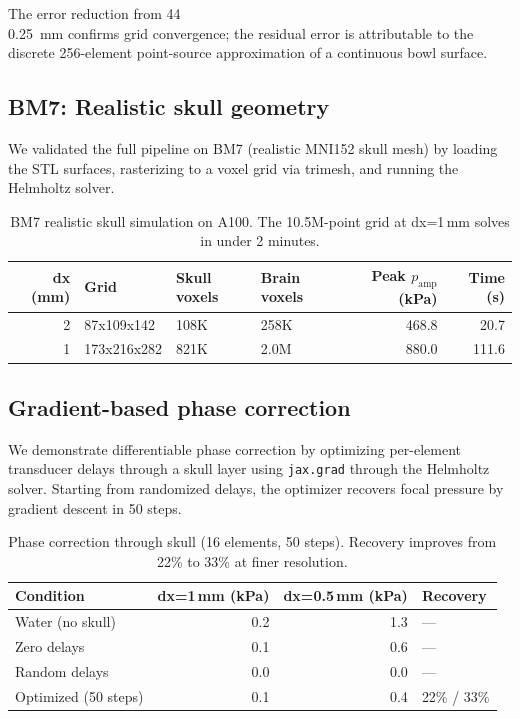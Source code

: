 \documentclass[11pt,a4paper]{article}\usepackage[]{graphicx}\usepackage[]{xcolor}
\begin{document}
The error reduction from 44\\%
\SI{0.25}{\milli\metre} confirms grid convergence; the residual error
is attributable to the discrete 256-element point-source approximation
of a continuous bowl surface.

\subsection{BM7: Realistic skull geometry}

We validated the full pipeline on BM7 (realistic MNI152 skull mesh) by
loading the STL surfaces, rasterizing to a voxel grid via trimesh, and
running the Helmholtz solver.

\begin{table}

\caption{\label{tab:bm7_results}BM7 realistic skull simulation on A100. The 10.5M-point grid at dx=1\,mm solves in under 2 minutes.}
\centering
\begin{tabular}[t]{rlllrr}
\toprule
dx (mm) & Grid & Skull voxels & Brain voxels & Peak $p_{\text{amp}}$ (kPa) & Time (s)\\
\midrule
2 & 87x109x142 & 108K & 258K & 468.8 & 20.7\\
1 & 173x216x282 & 821K & 2.0M & 880.0 & 111.6\\
\bottomrule
\end{tabular}
\end{table}



\subsection{Gradient-based phase correction}

We demonstrate differentiable phase correction by optimizing per-element
transducer delays through a skull layer using \texttt{jax.grad} through
the Helmholtz solver. Starting from randomized delays, the optimizer
recovers focal pressure by gradient descent in 50 steps.

\begin{table}

\caption{\label{tab:phase_correction}Phase correction through skull (16 elements, 50 steps). Recovery improves from 22\% to 33\% at finer resolution.}
\centering
\begin{tabular}[t]{lrrl}
\toprule
Condition & dx=1\,mm (kPa) & dx=0.5\,mm (kPa) & Recovery\\
\midrule
Water (no skull) & 0.2 & 1.3 & ---\\
Zero delays & 0.1 & 0.6 & ---\\
Random delays & 0.0 & 0.0 & ---\\
Optimized (50 steps) & 0.1 & 0.4 & 22\% / 33\%\\
\bottomrule
\end{tabular}
\end{table}
\end{document}

